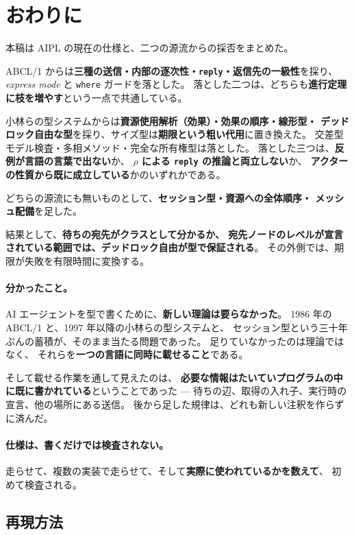 \documentclass[11pt,a4paper]{ltjsarticle}
\theoremstyle{definition}
\theoremstyle{remark}
\begin{document}
\section{おわりに}

本稿は AIPL の現在の仕様と、二つの源流からの採否をまとめた。

ABCL/1 からは\textbf{三種の送信・内部の逐次性・\texttt{reply}・返信先の一級性}を採り、
\textit{express mode} と \texttt{where} ガードを落とした。
落とした二つは、どちらも\textbf{進行定理に枝を増やす}という一点で共通している。

小林らの型システムからは\textbf{資源使用解析（効果）・効果の順序・線形型・
デッドロック自由な型}を採り、サイズ型は\textbf{期限という粗い代用}に置き換えた。
交差型モデル検査・多相メソッド・完全な所有権型は落とした。
落とした三つは、\textbf{反例が言語の言葉で出ない}か、
\textbf{$\rho$ による \texttt{reply} の推論と両立しない}か、
\textbf{アクターの性質から既に成立している}かのいずれかである。

どちらの源流にも無いものとして、\textbf{セッション型・資源への全体順序・
メッシュ配備}を足した。

結果として、\textbf{待ちの宛先がクラスとして分かるか、
宛先ノードのレベルが宣言されている範囲では、デッドロック自由が型で保証される}。
その外側では、期限が失敗を有限時間に変換する。

\paragraph{分かったこと。}
AI エージェントを型で書くために、\textbf{新しい理論は要らなかった}。
1986 年の ABCL/1 と、1997 年以降の小林らの型システムと、
セッション型という三十年ぶんの蓄積が、そのまま当たる問題であった。
足りていなかったのは理論ではなく、
それらを\textbf{一つの言語に同時に載せること}である。

そして載せる作業を通して見えたのは、
\textbf{必要な情報はたいていプログラムの中に既に書かれている}ということであった ---
待ちの辺、取得の入れ子、実行時の宣言、他の場所にある送信。
後から足した規律は、どれも新しい注釈を作らずに済んだ。

\paragraph{仕様は、書くだけでは検査されない。}
走らせて、複数の実装で走らせて、そして\textbf{実際に使われているかを数えて}、
初めて検査される。

\subsection*{再現方法}
\end{document}
